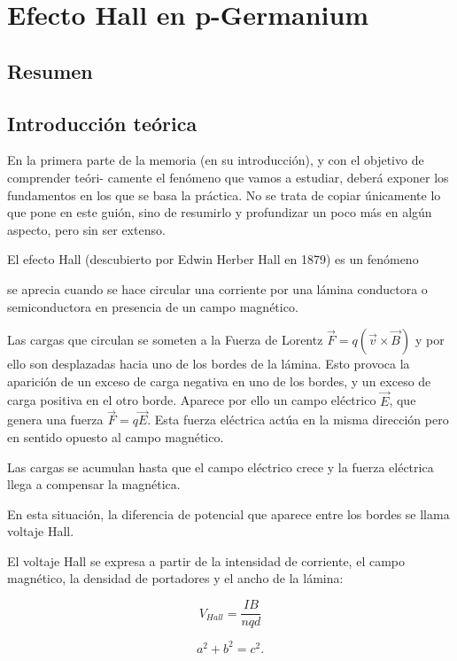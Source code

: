 




\chapter{Efecto Hall en p-Germanium}

\section{Resumen}




\section{Introducción teórica}


En la primera parte de la memoria (en su introducción), y con el objetivo de comprender teóri-
camente el fenómeno que vamos a estudiar, deberá exponer los fundamentos en los que se basa la
práctica. No se trata de copiar únicamente lo que pone en este guión, sino de resumirlo y profundizar
un poco más en algún aspecto, pero sin ser extenso.


El efecto Hall (descubierto por Edwin Herber Hall en 1879) es un fenómeno 

se aprecia cuando se hace circular una corriente por una lámina conductora o semiconductora en presencia de un campo magnético. 

Las cargas que circulan se someten a la Fuerza de Lorentz $\vec{F} = q(\vec{v} \times \vec{B})$ y por ello son desplazadas hacia uno de los bordes de la lámina. Esto provoca la aparición de un exceso de carga negativa en uno de los bordes, y un exceso de carga positiva en el otro borde. Aparece por ello un campo eléctrico $\vec{E}$, que genera una fuerza $\vec{F}= q \vec{E}$. Esta fuerza eléctrica actúa en la misma dirección pero en sentido opuesto al campo magnético. 

Las cargas se acumulan hasta que el campo eléctrico crece y la fuerza eléctrica llega a compensar la magnética. 

En esta situación, la diferencia de potencial que aparece entre los bordes se llama voltaje Hall. 

El voltaje Hall se expresa a partir de la intensidad de corriente, el campo magnético, la densidad de portadores y el ancho de la lámina:


\[ V_{Hall} = \frac{I B}{nqd}
\]

\begin{equation}\label{eq:pythagoras}
a^2 + b^2 = c^2 .
\end{equation}


